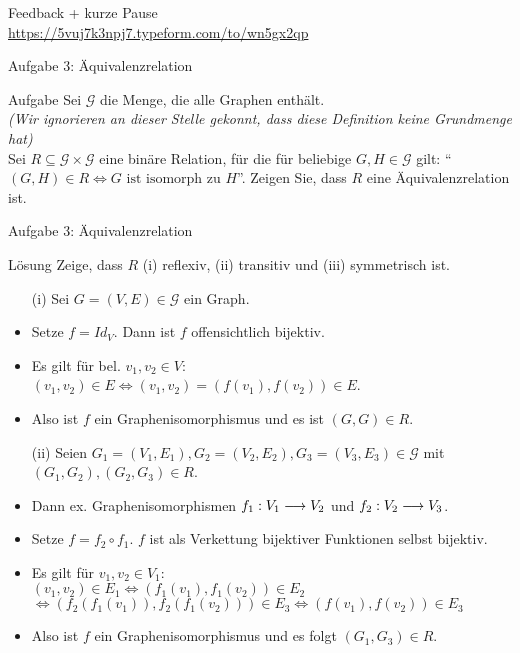 \begin{headframe}{}
	Feedback + kurze Pause \\
	\small\url{https://5vuj7k3npj7.typeform.com/to/wn5gx2qp}
\end{headframe}

\begin{frame}{Aufgabe 3: Äquivalenzrelation}
	\begin{block}{Aufgabe}
		Sei $\mathcal{G}$ die Menge, die alle Graphen enthält.\\
		\textit{(Wir ignorieren an dieser Stelle gekonnt, dass diese Definition keine Grundmenge hat)} \\
		Sei $R\subseteq \mathcal{G} \times \mathcal{G}$ eine binäre Relation, für die für beliebige $G,H\in\mathcal{G}$ gilt: ``$(G,H)\in R \Leftrightarrow G \text{ ist isomorph zu } H$''. Zeigen Sie, dass $R$ eine Äquivalenzrelation ist.
	\end{block}
\end{frame}

\begin{frame}{Aufgabe 3: Äquivalenzrelation}
	\begin{block}{Lösung}
		Zeige, dass $R$ (i) reflexiv, (ii) transitiv und (iii) symmetrisch ist.
		\begin{itemize}
			\item[(i)] Sei $G=(V,E)\in\mathcal{G}$ ein Graph.
			\item Setze $f=Id_V$. Dann ist $f$ offensichtlich bijektiv.
			\item Es gilt für bel. $v_1,v_2\in V$: $(v_1,v_2) \in E \Leftrightarrow (v_1,v_2)=(f(v_1),f(v_2))\in E$.
			\item Also ist $f$ ein Graphenisomorphismus und es ist $(G,G)\in R$.
			\item[(ii)] Seien $G_1=(V_1,E_1),G_2=(V_2,E_2),G_3=(V_3,E_3)\in\mathcal{G}$ mit $(G_1,G_2),(G_2,G_3)\in R$.
			\item Dann ex. Graphenisomorphismen $f_1 : V_1 \longrightarrow V_2$ und $f_2 : V_2 \longrightarrow V_3$.
			\item Setze $f=f_2 \circ f_1$. $f$ ist als Verkettung bijektiver Funktionen selbst bijektiv.
			\item Es gilt für $v_1,v_2\in V_1$: \\
				$(v_1,v_2) \in E_1 \Leftrightarrow (f_1(v_1),f_1(v_2)) \in E_2 $ \\
				$\Leftrightarrow (f_2(f_1(v_1)),f_2(f_1(v_2))) \in E_3 \Leftrightarrow (f(v_1),f(v_2)) \in E_3 $
			\item Also ist $f$ ein Graphenisomorphismus und es folgt $(G_1,G_3) \in R$.
		\end{itemize}
	\end{block}
\end{frame}

